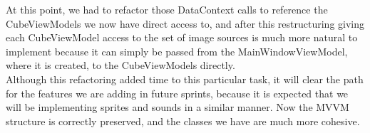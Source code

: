 \documentclass[12pt]{article}
\begin{document}
At this point, we had to refactor those DataContext calls to reference the CubeViewModels we now have direct access to, and after this restructuring giving each CubeViewModel access to the set of image sources is much more natural to implement because it can simply be passed from the MainWindowViewModel, where it is created, to the CubeViewModels directly. \\

Although this refactoring added time to this particular task, it will clear the path for the features we are adding in future sprints, because it is expected that we will be implementing sprites and sounds in a similar manner. Now the MVVM structure is correctly preserved, and the classes we have are much more cohesive.

        
\end{document}
